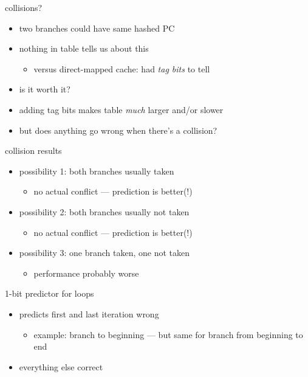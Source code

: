 

\begin{frame}{collisions?}
\begin{itemize}
\item two branches could have same hashed PC
\item nothing in table tells us about this
    \begin{itemize}
    \item versus direct-mapped cache: had \textit{tag bits} to tell
    \end{itemize}
\vspace{.5cm}
\item is it worth it?
\item adding tag bits makes table \textit{much} larger and/or slower
\item but does anything go wrong when there's a collision?
\end{itemize}
\end{frame}

\begin{frame}{collision results}
\begin{itemize}
\item possibility 1: both branches usually taken
    \begin{itemize}
    \item no actual conflict --- prediction is better(!)
    \end{itemize}
\item possibility 2: both branches usually not taken
    \begin{itemize}
    \item no actual conflict --- prediction is better(!)
    \end{itemize}
\item possibility 3: one  branch taken, one not taken
    \begin{itemize}
    \item performance probably worse
    \end{itemize}
\end{itemize}
\end{frame}

\begin{frame}{1-bit predictor for loops}
\begin{itemize}
\item predicts first and last iteration wrong
    \begin{itemize}
    \item example: branch to beginning --- but same for branch from beginning to end
    \end{itemize}
\item everything else correct
\end{itemize}
\end{frame}

